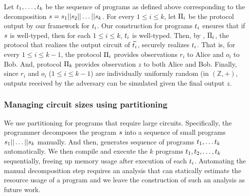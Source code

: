  Let $t_1, \ldots, t_k$ be the
sequence of programs as defined above corresponding to the
decomposition $s = s_1||s_2||\ldots||s_k$.  For every
$1\leq i\leq k$, let $\Pi_i$ be the \mpc protocol output by our
framework for $t_i$. Our construction for programs $t_i$
ensures that if $s$ is well-typed, then for each $1\leq i \leq k$,
$t_i$ is well-typed. Then, by , $\Pi_i$,
the \mpc protocol that realizes the output circuit of
$\widetilde{t_i}$,
securely realizes $t_i$. That is, for every $1\leq i \leq k-1$,
the protocol $\Pi_i$ provides observations $r_i$ to Alice and $o_i$
to Bob. And, protocol $\Pi_k$ provides observation $z$ to both Alice
and Bob. Finally, since $r_i$ and $o_i$ ($1\leq i\leq k-1$) are
individually uniformly random (in $(\mathbb{Z},+)$, outputs received
by the adversary can be simulated given the final output $z$.


%

\subsubsection*{Managing circuit sizes using partitioning}
We use partitioning for programs that require large
circuits. Specifically, the programmer decomposes the program
$s$ into a sequence of small programs
$s_1||\dots||s_k$ manually. And then, \tool generates
sequence of programs $t_1,\dots t_k$ automatically. We then
compile and execute the $k$ programs
$t_1,t_2,\ldots,t_k$ sequentially, freeing up memory
usage after execution of each $t_i$.
Automating the manual decomposition step requires an analysis that can 
statically estimate the resource usage of a \tool program and we leave
the construction of such an analysis as future work.
